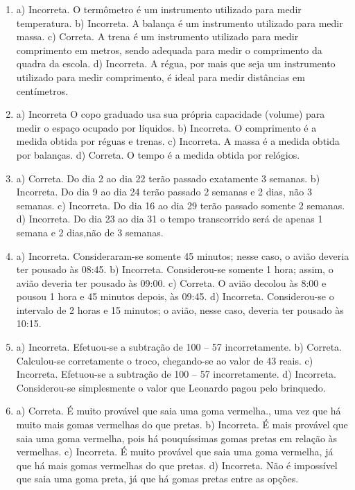 \begin{enumerate}
\item
a) Incorreta. O termômetro é um instrumento utilizado para medir temperatura.
b) Incorreta. A balança é um instrumento utilizado para medir massa.
c) Correta. A trena é um instrumento utilizado para medir comprimento
em metros, sendo adequada para medir o comprimento da quadra da escola.
d) Incorreta. A régua, por mais que seja um instrumento utilizado para
medir comprimento, é ideal para medir distâncias em centímetros.

\item
a) Incorreta O copo graduado usa sua própria capacidade (volume) para
medir o espaço ocupado por líquidos.
b) Incorreta. O comprimento é a medida obtida por réguas e trenas.
c) Incorreta. A massa é a medida obtida por balanças.
d) Correta. O tempo é a medida obtida por relógios.

\item
a) Correta. Do dia 2 ao dia 22 terão passado exatamente 3 semanas.
b) Incorreta. Do dia 9 ao dia 24 terão passado 2 semanas e 2 dias, não 3 semanas.
c) Incorreta. Do dia 16 ao dia 29 terão passado somente 2 semanas.
d) Incorreta. Do dia 23 ao dia 31 o tempo transcorrido será de apenas 1 semana e 2 dias,não de 3 semanas.

\item
a) Incorreta. Consideraram-se somente 45 minutos; nesse caso, o avião deveria ter pousado às 08:45.
b) Incorreta. Considerou-se somente 1 hora; assim, o avião deveria ter pousado às 09:00.
c) Correta. O avião decolou às 8:00 e pousou 1 hora e 45 minutos depois, às 09:45.
d) Incorreta. Considerou-se o intervalo de 2 horas e 15 minutos; o avião, nesse caso, deveria ter
pousado às 10:15.

\item
a) Incorreta. Efetuou-se a subtração de 100 -- 57 incorretamente.
b) Correta. Calculou-se corretamente o troco, chegando-se ao valor de 43 reais.
c) Incorreta. Efetuou-se a subtração de 100 -- 57 incorretamente.
d) Incorreta. Considerou-se simplesmente o valor que Leonardo pagou pelo brinquedo.

\item
a) Correta. É muito provável que saia uma goma vermelha., uma vez que há
muito mais gomas vermelhas do que pretas.
b) Incorreta. É mais provável que saia uma goma vermelha, pois há
pouquíssimas gomas pretas em relação às vermelhas.
c) Incorreta. É muito provável que saia uma goma vermelha, já que há
mais gomas vermelhas do que pretas.
d) Incorreta. Não é impossível que saia uma goma preta, já que há gomas
pretas entre as opções.


\end{enumerate}
